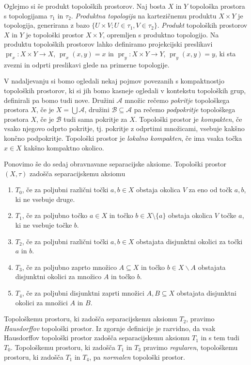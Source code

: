 \documentclass[mat1]{fmfdelo}
\DeclareMathOperator{\pr}{pr}
\begin{document}
Oglejmo si še produkt topoloških prostorov.
Naj bosta $X$ in $Y$ topološka prostora s topologijama $\tau_1$ in $\tau_2$. \emph{Produktna topologija} na kartezičnemu produktu $X \times Y$ je topologija, generirana z bazo $\lbrace U \times V ; U \in \tau_1, V \in \tau_2 \rbrace$. \emph{Produkt} topoloških prostorov $X$ in $Y$ je topološki prostor $X \times Y$, opremljen s produktno topologijo. Na produktu topoloških prostorov lahko definiramo projekcijski preslikavi $\pr_x\colon X \times Y \to X$, $\pr_x(x, y) = x$ in $\pr_y\colon X \times Y \to Y$, $\pr_y(x, y) = y$, ki sta zvezni in odprti preslikavi glede na primerne topologije.

V nadaljevanju si bomo ogledali nekaj pojmov povezanih s kompaktnostjo to\-po\-loš\-kih prostorov, ki si jih bomo kasneje ogledali v kontekstu topoloških grup, definirali pa bomo tudi nove.
Družini $\mathcal{A}$ množic rečemo \emph{pokritje} topološkega prostora $X$, če je $X = \bigcup \mathcal{A}$, družini $\mathcal{B} \subseteq \mathcal{A}$ pa rečemo \emph{podpokritje} topološkega prostora $X$, če je $\mathcal{B}$ tudi sama pokritje za $X$.
Topološki prostor je \emph{kompakten}, če vsako njegovo odprto pokritje, tj. pokritje z odprtimi množicami, vsebuje kakšno končno podpokritje.
Topološki prostor je \emph{lokalno kompakten}, če ima vsaka točka $x \in X$ kakšno kompaktno okolico.

Ponovimo še do sedaj obravnavane separacijske aksiome.
Topološki prostor $(X, \tau)$ zadošča separacijskemu aksiomu
\begin{enumerate}
\item[] $T_0$, če za poljubni različni točki $a, b \in X$ obstaja okolica $V$ za eno od točk $a, b$, ki ne vsebuje druge.
\item[] $T_1$, če za poljubno točko $a \in X$ in točko $b \in X\setminus\lbrace a \rbrace$ obstaja okolica $V$ točke $a$, ki ne vsebuje točke $b$.
\item[] $T_2$, če za poljubni različni točki $a, b \in X$ obstajata disjunktni okolici za točki $a$ in $b$.
\item[] $T_3$, če za poljubno zaprto množico $A \subseteq X$ in točko $b \in X\backslash A$ obstajata disjunktni okolici za množico $A$ in točko $b$.
\item[] $T_4$, če za poljubni disjunktni zaprti množici $A, B \subseteq X$ obstajata disjunktni okolici za množici $A$ in $B$.
\end{enumerate}

Topološkemu prostoru, ki zadošča separacijskemu aksiomu $T_2$, pravimo \emph{Hausdorffov} topološki prostor. Iz zgornje definicije je razvidno, da vsak Hausdorffov topološki prostor zadošča separacijskemu aksiomu $T_1$ in s tem tudi $T_0$.
Topološkemu prostoru, ki zadošča $T_1$ in $T_3$ pravimo \emph{regularen},
topološkemu prostoru, ki zadošča $T_1$ in $T_4$, pa \emph{normalen} topološki prostor.
\end{document}
